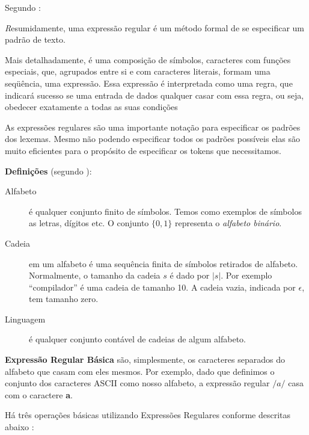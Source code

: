 Segundo :
\begin{citacao}{4cm}{0cm} \footnotesize \emph
	Resumidamente, uma expressão regular é um método formal de se especificar um padrão de texto.

	Mais detalhadamente, é uma composição de símbolos, caracteres com funções
	especiais, que, agrupados entre si e com caracteres literais, formam uma
	seqüência, uma expressão. Essa expressão é interpretada como uma regra, que
	indicará sucesso se uma entrada de dados qualquer casar com essa regra, ou
	seja, obedecer exatamente a todas as suas condições
\end{citacao}

As expressões regulares são uma importante notação para especificar os padrões
dos lexemas. Mesmo não podendo especificar todos os padrões possíveis elas são
muito eficientes para o propósito de especificar os tokens que necessitamos.

\textbf{Definições} (segundo ):
\begin{description}
	\item[Alfabeto] é qualquer conjunto finito de símbolos. Temos como exemplos
		de símbolos as letras, dígitos etc. O conjunto $\{0, 1\}$ representa o
		\emph{alfabeto binário}.
	\item[Cadeia] em um alfabeto é uma sequência finita de símbolos retirados de
		alfabeto. Normalmente, o tamanho da cadeia $s$ é dado por $|s|$. Por
		exemplo ``compilador'' é uma cadeia de tamanho 10. A cadeia vazia,
		indicada por $\epsilon$, tem tamanho zero.
	\item[Linguagem] é qualquer conjunto contável de cadeias de algum alfabeto.
\end{description}

\textbf{Expressão Regular Básica} são, simplesmente, os caracteres separados do
alfabeto que casam com eles mesmos. Por exemplo, dado que definimos o conjunto
dos caracteres ASCII como nosso alfabeto, a expressão regular $/a/$ casa com o
caractere \textbf{a}.

Há três operações básicas utilizando Expressões Regulares conforme descritas
abaixo \cite{louden97-pt}:

